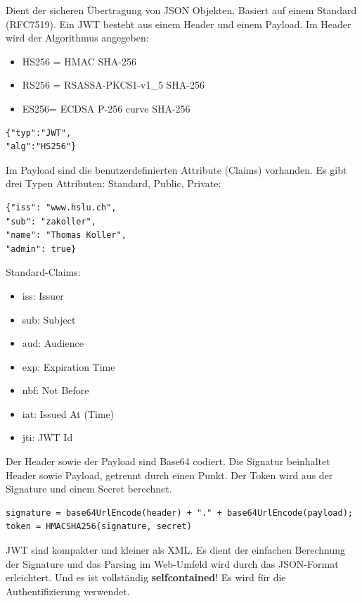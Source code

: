 Dient der sicheren Übertragung von JSON Objekten. Basiert auf einem Standard (RFC7519). Ein JWT besteht aus einem Header und einem Payload. Im Header wird der Algorithmus angegeben:
\begin{itemize}
	\item HS256 = HMAC SHA-256
	\item RS256 = RSASSA-PKCS1-v1\_5 SHA-256
	\item ES256= ECDSA P-256 curve SHA-256
\end{itemize}

\begin{lstlisting}[caption=JWT Header]
{"typ":"JWT",
"alg":"HS256"}
\end{lstlisting}

Im Payload sind die benutzerdefinierten Attribute (Claims) vorhanden. Es gibt drei Typen Attributen: Standard, Public, Private:

\begin{lstlisting}[caption=JWT Payload]
{"iss": "www.hslu.ch",
"sub": "zakoller",
"name": "Thomas Koller",
"admin": true}
\end{lstlisting}

Standard-Claims:
\begin{itemize}
	\item iss: Issuer
	\item sub: Subject
	\item aud: Audience
	\item exp: Expiration Time
	\item nbf: Not Before
	\item iat: Issued At (Time)
	\item jti: JWT Id
\end{itemize}

Der Header sowie der Payload sind Base64 codiert. Die Signatur beinhaltet Header sowie Payload, getrennt durch einen Punkt. Der Token wird aus der Signature und einem Secret berechnet.

\begin{lstlisting}[caption=JWT Signature]
signature = base64UrlEncode(header) + "." + base64UrlEncode(payload);
token = HMACSHA256(signature, secret)
\end{lstlisting}

JWT sind kompakter und kleiner als XML. Es dient der einfachen Berechnung der Signature und das Parsing im Web-Umfeld wird durch das JSON-Format erleichtert. Und es ist vollständig \textbf{selfcontained}! Es wird für die Authentifizierung verwendet.

